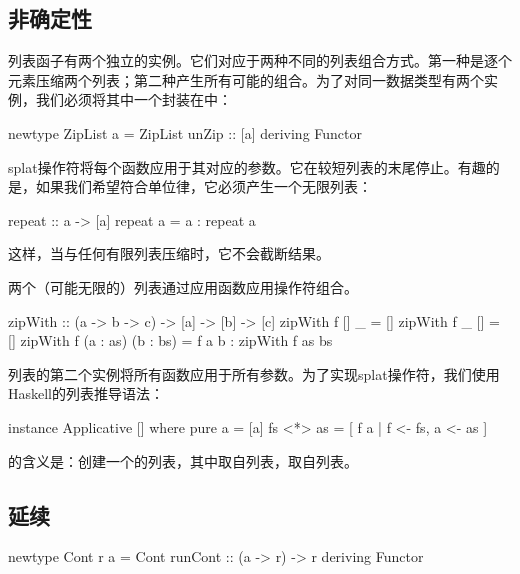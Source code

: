 \documentclass[DaoFP]{subfiles}
\begin{document}
\subsection{非确定性}
列表函子有两个独立的实例。它们对应于两种不同的列表组合方式。第一种是逐个元素压缩两个列表；第二种产生所有可能的组合。为了对同一数据类型有两个实例，我们必须将其中一个封装在中：
\begin{haskell}
newtype ZipList a = ZipList { unZip :: [a] }
  deriving Functor
\end{haskell}
splat操作符将每个函数应用于其对应的参数。它在较短列表的末尾停止。有趣的是，如果我们希望符合单位律，它必须产生一个无限列表：
\begin{haskell}
repeat :: a -> [a]
repeat a = a : repeat a
\end{haskell}
这样，当与任何有限列表压缩时，它不会截断结果。
两个（可能无限的）列表通过应用函数应用操作符\hask{$}组合。
\begin{haskell}
zipWith :: (a -> b -> c) -> [a] -> [b] -> [c]
zipWith f [] _ = []
zipWith f _ [] = []
zipWith f (a : as) (b : bs) = f a b : zipWith f as bs 
\end{haskell}

列表的第二个实例将所有函数应用于所有参数。为了实现splat操作符，我们使用Haskell的列表推导语法：
\begin{haskell}
instance Applicative [] where
  pure a = [a]
  fs <*> as = [ f a | f <- fs, a <- as ]
\end{haskell}
\hask{[f a | f <- fs, a <- as]}的含义是：创建一个的列表，其中取自列表，取自列表。

\subsection{延续}
\begin{haskell}
newtype Cont r a = Cont { runCont :: (a -> r) -> r }
  deriving Functor
\end{haskell}
\end{document}
